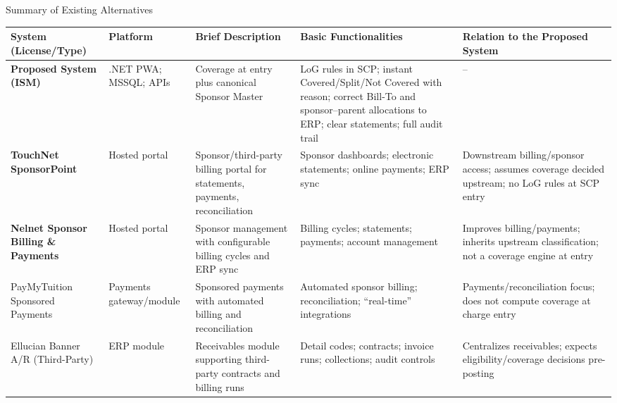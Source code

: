 \begin{center}
\captionsetup{type=table}
\caption{Summary of Existing Alternatives}
\label{table:existing-alternatives-summary}
\smalltable
\scriptsize
\begin{tabular}{|>{\raggedright\arraybackslash}p{2.6cm}|
                >{\raggedright\arraybackslash}p{1.8cm}|
                >{\raggedright\arraybackslash}p{2.6cm}|
                >{\raggedright\arraybackslash}p{2.6cm}|
                >{\raggedright\arraybackslash}p{2.6cm}|}
\hline
\textbf{System (License/Type)} &
\textbf{Platform} &
\textbf{Brief Description} &
\textbf{Basic Functionalities} &
\textbf{Relation to the Proposed System} \\
\hline\hline

\textbf{Proposed System (ISM)} &
.NET PWA; MSSQL; APIs &
Coverage at entry plus canonical Sponsor Master &
LoG rules in SCP; instant Covered/Split/Not Covered with reason; correct Bill-To and sponsor–parent allocations to ERP; clear statements; full audit trail &
-- \\
\hline

\textbf{TouchNet SponsorPoint}\tnote{d} &
Hosted portal &
Sponsor/third-party billing portal for statements, payments, reconciliation &
Sponsor dashboards; electronic statements; online payments; ERP sync &
Downstream billing/sponsor access; assumes coverage decided upstream; no LoG rules at SCP entry \\
\hline

\textbf{Nelnet Sponsor Billing \& Payments}\tnote{e} &
Hosted portal &
Sponsor management with configurable billing cycles and ERP sync &
Billing cycles; statements; payments; account management &
Improves billing/payments; inherits upstream classification; not a coverage engine at entry \\
\hline

PayMyTuition Sponsored Payments\tnote{f} &
Payments gateway/module &
Sponsored payments with automated billing and reconciliation &
Automated sponsor billing; reconciliation; “real-time” integrations &
Payments/reconciliation focus; does not compute coverage at charge entry \\
\hline

Ellucian Banner A/R (Third-Party)\tnote{a,c} &
ERP module &
Receivables module supporting third-party contracts and billing runs &
Detail codes; contracts; invoice runs; collections; audit controls &
Centralizes receivables; expects eligibility/coverage decisions pre-posting \\
\hline


\end{tabular}
\end{center}


